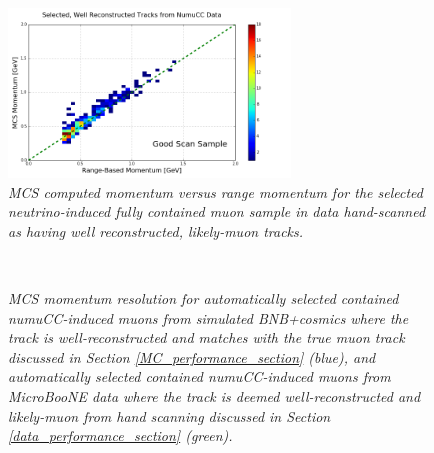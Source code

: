 \begin{figure}
\centering
	\includegraphics[width=75mm]{Figures/MCS_range_momentum_DataRecoTracks_goodhandscan.png}
\caption{\textit{MCS computed momentum versus range momentum for the selected neutrino-induced fully contained muon sample in data hand-scanned as having well reconstructed, likely-muon tracks.}}
\label{pub_plot_4}
\end{figure}



\begin{figure}
\centering
\mbox{
	\quad
	}
\caption{\textit{MCS momentum resolution for automatically selected contained numuCC-induced muons from simulated BNB+cosmics where the track is well-reconstructed and matches with the true muon track discussed in Section \ref{MC_performance_section} (blue), and automatically selected contained numuCC-induced muons from MicroBooNE data where the track is deemed well-reconstructed and likely-muon from hand scanning discussed in Section \ref{data_performance_section} (green).}}\label{pub_plot_5}
\end{figure}

